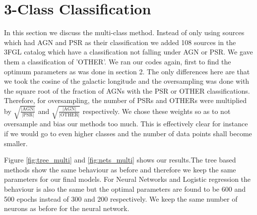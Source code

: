 \section{3-Class Classification}
In this section we discuss the multi-class method\footnotemark{}. Instead of only using sources which had AGN and PSR as their classification we added 108 sources in the 3FGL catalog which have a classification not falling under AGN or PSR. We gave them a classification of 'OTHER'. We ran our codes again, first to find the optimum parameters as was done in section 2. The only differences here are that we took the cosine of the galactic longitude and the oversampling was done with the square root of the fraction of AGNs with the PSR or OTHER classifications. Therefore, for oversampling, the number of PSRs and OTHERs were multiplied by $\sqrt{\frac{\text{|AGN|}}{\text{|PSR|}}}$ and $\sqrt{\frac{\text{|AGN|}}{\text{|OTHER|}}}$ respectively. We chose these weights so as to not oversample and bias our methods too much. This is effectively clear for instance if we would go to even higher classes and the number of data points shall become smaller. 

Figure \ref{fig:tree_multi} and \ref{fig:nets_multi} shows our results.The tree based methods show the same behaviour as before and therefore we keep the same parameters for our final models. For Neural Networks and Logistic regression the behaviour is also the same but the optimal parameters are found to be 600 and 500 epochs instead of 300 and 200 respectively. We keep the same number of neurons as before for the neural network.


